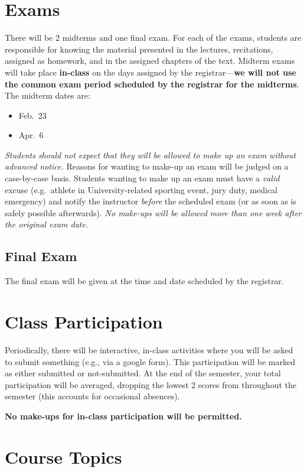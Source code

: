 \documentclass[10pt]{article}
\begin{document}
\section{Exams}

There will be 2 midterms and one final exam.  For each of the exams,
students are responsible for knowing the material presented in the
lectures, recitations, assigned as homework, and in the assigned
chapters of the text.  Midterm exams will take place {\bf in-class} on the days
assigned by the registrar---{\bf we will
  not use the common exam period scheduled by the registrar for the
  midterms}.  The midterm dates are:
\begin{itemize}
\item Feb.\ 23
\item Apr.\ 6
\end{itemize}

{\em Students should not expect that they will be allowed to make up
  an exam without advanced notice.}  Reasons for wanting to make-up an
exam will be judged on a case-by-case basis.  Students wanting to make
up an exam must have a {\em valid} excuse (e.g.\ athlete in
University-related sporting event, jury duty, medical emergency) and
notify the instructor {\em before} the scheduled exam (or as soon as
is safely possible afterwards).  {\em No make-ups will be allowed more
  than one week after the original exam date.}


\subsection{Final Exam}

The final exam will be given at the time and date scheduled by the
registrar.


\section{Class Participation}

Periodically, there will be interactive, in-class activities where you
will be asked to submit something (e.g., via a google form).  This
participation will be marked as either submitted or not-submitted.  At
the end of the semester, your total participation will be averaged,
dropping the lowest 2 scores from throughout the semester (this
accounts for occasional absences).

{\bf No make-ups for in-class participation will be permitted.}

\section{Course Topics}
\end{document}
